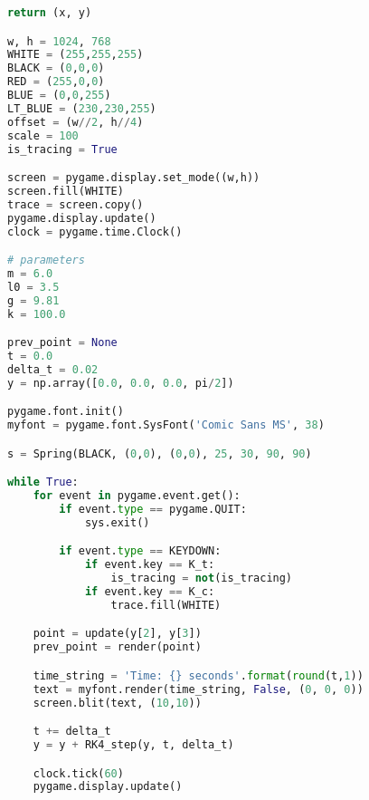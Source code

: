 \begin{lstlisting}[language=Python, caption=\textit{Path Animation Python Script for system \textbf{without} Damping}]
	return (x, y)

w, h = 1024, 768
WHITE = (255,255,255)
BLACK = (0,0,0)
RED = (255,0,0)
BLUE = (0,0,255)
LT_BLUE = (230,230,255)
offset = (w//2, h//4)
scale = 100
is_tracing = True

screen = pygame.display.set_mode((w,h))
screen.fill(WHITE)
trace = screen.copy()
pygame.display.update()
clock = pygame.time.Clock()

# parameters
m = 6.0
l0 = 3.5
g = 9.81
k = 100.0

prev_point = None
t = 0.0
delta_t = 0.02
y = np.array([0.0, 0.0, 0.0, pi/2])

pygame.font.init()
myfont = pygame.font.SysFont('Comic Sans MS', 38)

s = Spring(BLACK, (0,0), (0,0), 25, 30, 90, 90)

while True:
	for event in pygame.event.get():
		if event.type == pygame.QUIT:
			sys.exit()

		if event.type == KEYDOWN:
			if event.key == K_t:
				is_tracing = not(is_tracing)
			if event.key == K_c:
				trace.fill(WHITE)

	point = update(y[2], y[3])
	prev_point = render(point)

	time_string = 'Time: {} seconds'.format(round(t,1))
	text = myfont.render(time_string, False, (0, 0, 0))
	screen.blit(text, (10,10))

	t += delta_t
	y = y + RK4_step(y, t, delta_t) 

	clock.tick(60)
	pygame.display.update()

\end{lstlisting}
        
        \clearpage
        
